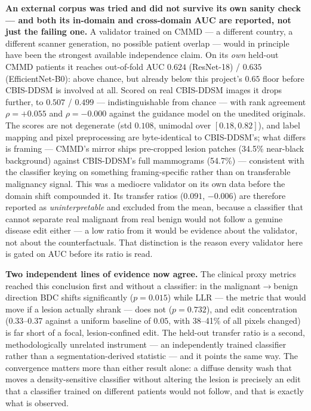\documentclass[11pt]{article}
\begin{document}
\textbf{An external corpus was tried and did not survive its own sanity
check --- and both its in-domain and cross-domain AUC are reported, not just
the failing one.} A validator trained on CMMD --- a different country, a
different scanner generation, no possible patient overlap --- would in
principle have been the strongest available independence claim. On its
\emph{own} held-out CMMD patients it reaches out-of-fold AUC $0.624$
(ResNet-18) / $0.635$ (EfficientNet-B0): above chance, but already below
this project's $0.65$ floor before CBIS-DDSM is involved at all. Scored on
real CBIS-DDSM images it drops further, to $0.507$ / $0.499$ ---
indistinguishable from chance --- with rank agreement $\rho=+0.055$ and
$\rho=-0.000$ against the guidance model on the unedited originals. The
scores are not degenerate (std $0.108$, unimodal over $[0.18,0.82]$), and
label mapping and pixel preprocessing are byte-identical to CBIS-DDSM's;
what differs is framing --- CMMD's mirror ships pre-cropped lesion patches
(34.5\% near-black background) against CBIS-DDSM's full mammograms
(54.7\%) --- consistent with the classifier keying on something
framing-specific rather than on transferable malignancy signal. This was a
mediocre validator on its own data before the domain shift compounded it.
Its transfer ratios ($0.091$, $-0.006$) are therefore reported as
\emph{uninterpretable} and excluded from the mean, because a classifier
that cannot separate real malignant from real benign would not follow a
genuine disease edit either --- a low ratio from it would be evidence
about the validator, not about the counterfactuals. That distinction is
the reason every validator here is gated on AUC before its ratio is read.

\textbf{Two independent lines of evidence now agree.} The clinical proxy
metrics reached this conclusion first and without a classifier: in the
malignant$\to$benign direction BDC shifts significantly ($p=0.015$) while
LLR --- the metric that would move if a lesion actually shrank --- does
not ($p=0.732$), and edit concentration (0.33--0.37 against a uniform
baseline of $0.05$, with 38--41\% of all pixels changed) is far short of
a focal, lesion-confined edit. The held-out transfer ratio is a second,
methodologically unrelated instrument --- an independently trained
classifier rather than a segmentation-derived statistic --- and it points
the same way. The convergence matters more than either result alone:
a diffuse density wash that moves a density-sensitive classifier without
altering the lesion is precisely an edit that a classifier trained on
different patients would not follow, and that is exactly what is observed.
\end{document}
